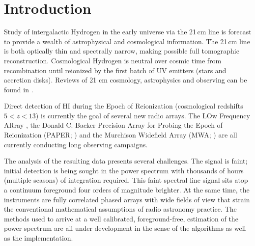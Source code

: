 \documentclass[preprint]{aastex}
\begin{document}
\begin{abstract}
\end{abstract}









\section{Introduction} 
  Study of intergalactic Hydrogen  in the early universe via the 21\,cm line is forecast to provide a wealth of astrophysical and cosmological information.  The 21\,cm line is both optically thin and spectrally narrow, making possible full tomographic reconstruction. Cosmological Hydrogen is neutral over cosmic time from recombination until reionized by the first batch of UV emitters (stars and accretion disks).  Reviews of 21 cm cosmology, astrophysics and observing can be found in \cite{Morales:2010p8093,Furlanetto:2006p2267,Pritchard:2012p9555,zaroubi2013epoch}.
  
Direct detection of HI during the Epoch of Reionization (cosmological redshifts $5<z<13$) is currently the goal of several new radio arrays. The LOw Frequency ARray \citep[LOFAR;]{Yatawatta:2013p9699}, the Donald C. Backer Precision Array for Probing the Epoch of Reionization (PAPER; \citet{Parsons:2014p10499}) and the Murchison Widefield Array (MWA; \cite{Tingay:2013p9022,Bowman:2013p9950}) are all currently conducting long observing campaigns.

The analysis of the resulting data presents several challenges. The signal is faint; initial detection is being sought in the power spectrum with thousands of hours (multiple seasons) of integration required. This faint spectral line signal sits atop a continuum foreground four orders of magnitude brighter. At the same time, the instruments are fully correlated phased arrays with wide fields of view that strain the conventional mathematical assumptions of radio astronomy practice. The methods used to arrive at a well calibrated, foreground-free, estimation of the power spectrum are all under development in the sense of the algorithms as well as the implementation.  
\end{document}
